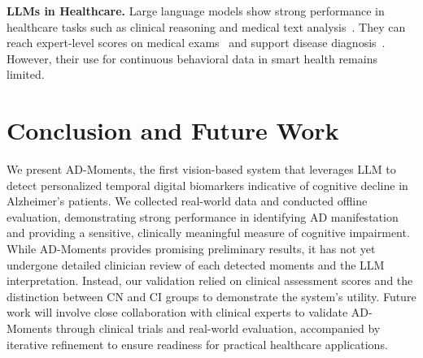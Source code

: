 \documentclass[sigconf, anonymous, 9pt, nonacm]{acmart}
\newcommand{\sys}{AD-Moments\xspace}
\begin{document}
\noindent\textbf{LLMs in Healthcare.}
Large language models show strong performance in healthcare tasks such as clinical reasoning and medical text analysis~\cite{Singhal2023ClinicalLLMs,Kwon2024_ReasoningLLM}. They can reach expert-level scores on medical exams~\cite{nori2023gpt4med,Singhal2025ExpertLLM} and support disease diagnosis~\cite{McDuff2025LLM_Diagnosis}. However, their use for continuous behavioral data in smart health remains limited.



\section{Conclusion and Future Work}
\label{sec:conclusion}

We present \sys, the first vision-based system that leverages LLM to detect personalized temporal digital biomarkers indicative of cognitive decline in Alzheimer's patients. We collected real-world data and conducted offline evaluation, demonstrating strong performance in identifying AD manifestation and providing a sensitive, clinically meaningful measure of cognitive impairment.
While \sys provides promising preliminary results, it has not yet undergone detailed clinician review of each detected moments and the LLM interpretation. Instead, our validation relied on clinical assessment scores and the distinction between CN and CI groups to demonstrate the system’s utility. Future work will involve close collaboration with clinical experts to validate \sys through clinical trials and real-world evaluation, accompanied by iterative refinement to ensure readiness for practical healthcare applications.



\balance

%

\end{document}
